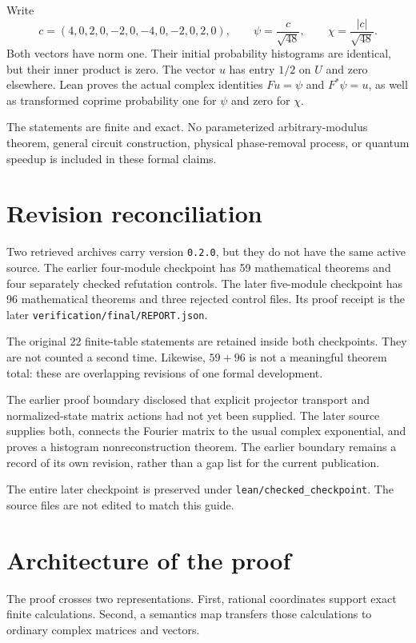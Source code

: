 Write
\[
 c=(4,0,2,0,-2,0,-4,0,-2,0,2,0),\qquad
 \psi=\frac{c}{\sqrt{48}},\qquad \chi=\frac{|c|}{\sqrt{48}}.
\]
Both vectors have norm one. Their initial probability histograms are identical,
but their inner product is zero. The vector \(u\) has entry \(1/2\) on \(U\)
and zero elsewhere. Lean proves the actual complex identities \(Fu=\psi\) and
\(F^*\psi=u\), as well as transformed coprime probability one for \(\psi\)
and zero for \(\chi\).

The statements are finite and exact. No parameterized arbitrary-modulus theorem,
general circuit construction, physical phase-removal process, or quantum speedup
is included in these formal claims.

\section{Revision reconciliation}
Two retrieved archives carry version \texttt{0.2.0}, but they do not have the same
active source. The earlier four-module checkpoint has 59 mathematical theorems
and four separately checked refutation controls. The later five-module checkpoint
has 96 mathematical theorems and three rejected control files. Its proof receipt
is the later \texttt{verification/final/REPORT.json}.

The original 22 finite-table statements are retained inside both checkpoints.
They are not counted a second time. Likewise, \(59+96\) is not a meaningful
theorem total: these are overlapping revisions of one formal development.

The earlier proof boundary disclosed that explicit projector transport and
normalized-state matrix actions had not yet been supplied. The later source
supplies both, connects the Fourier matrix to the usual complex exponential, and
proves a histogram nonreconstruction theorem. The earlier boundary remains a
record of its own revision, rather than a gap list for the current publication.

The entire later checkpoint is preserved under \texttt{lean/checked\_checkpoint}.
The source files are not edited to match this guide.

\section{Architecture of the proof}
The proof crosses two representations. First, rational coordinates support exact
finite calculations. Second, a semantics map transfers those calculations to
ordinary complex matrices and vectors.

